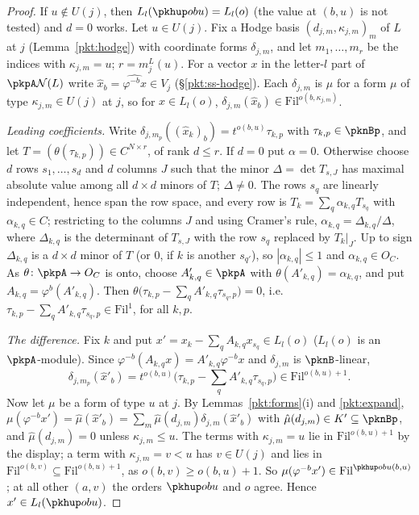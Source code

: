 \documentclass[10pt]{amsart}
\theoremstyle{definition}
\theoremstyle{remark}
\begin{document}
\begin{proof}
If $u\notin U(j)$, then $L_l(\pkhup obu)=L_l(o)$ (the value at $(b,u)$ is not tested) and $d=0$ works. Let
$u\in U(j)$. Fix a Hodge basis $(d_{j,m},\kappa_{j,m})_m$ of $L$ at $j$ (Lemma~\ref{pkt:hodge}) with coordinate
forms $\delta_{j,m}$, and let $m_1,\dots,m_r$ be the indices with $\kappa_{j,m}=u$; $r=m^L_j(u)$. For a vector
$x$ in the letter-$l$ part of $\pkpA\mathcal N(L)$ write $\hat x_b=\widehat{\varphi^{-b}x}\in V_j$
(\S\ref{pkt:ss-hodge}). Each $\delta_{j,m}$ is $\hat\mu$ for a form $\mu$ of type $\kappa_{j,m}\in U(j)$ at $j$,
so for $x\in L_l(o)$, $\delta_{j,m}(\hat x_b)\in\mathrm{Fil}^{o(b,\kappa_{j,m})}$.

\emph{Leading coefficients.} Write $\delta_{j,m_p}((\hat x_k)_b)=t^{o(b,u)}\tau_{k,p}$ with $\tau_{k,p}\in\pknBp$,
and let $T=(\theta(\tau_{k,p}))\in C^{N\times r}$, of rank $d\le r$. If $d=0$ put $\alpha=0$. Otherwise choose
$d$ rows $s_1,\dots,s_d$ and $d$ columns $J$ such that the minor $\Delta=\det T_{s,J}$ has maximal absolute
value among all $d\times d$ minors of $T$; $\Delta\ne0$. The rows $s_q$ are linearly independent, hence span
the row space, and every row is $T_k=\sum_q\alpha_{k,q}T_{s_q}$ with $\alpha_{k,q}\in C$; restricting to the
columns $J$ and using Cramer's rule, $\alpha_{k,q}=\Delta_{k,q}/\Delta$, where $\Delta_{k,q}$ is the determinant
of $T_{s,J}$ with the row $s_q$ replaced by $T_k|_J$. Up to sign $\Delta_{k,q}$ is a $d\times d$ minor of $T$
(or $0$, if $k$ is another $s_{q'}$), so $|\alpha_{k,q}|\le1$ and $\alpha_{k,q}\in O_C$. As $\theta\colon\pkpA\to
O_C$ is onto, choose $A'_{k,q}\in\pkpA$ with $\theta(A'_{k,q})=\alpha_{k,q}$, and put $A_{k,q}=\varphi^b(A'_{k,q})$.
Then $\theta\bigl(\tau_{k,p}-\sum_qA'_{k,q}\tau_{s_q,p}\bigr)=0$, i.e.\
$\tau_{k,p}-\sum_qA'_{k,q}\tau_{s_q,p}\in\mathrm{Fil}^1$, for all $k,p$.

\emph{The difference.} Fix $k$ and put $x'=x_k-\sum_qA_{k,q}x_{s_q}\in L_l(o)$ ($L_l(o)$ is an $\pkpA$-module).
Since $\varphi^{-b}(A_{k,q}x)=A'_{k,q}\varphi^{-b}x$ and $\delta_{j,m}$ is $\pknB$-linear,
\[
\delta_{j,m_p}(\hat x'_b)=t^{o(b,u)}\bigl(\tau_{k,p}-\textstyle\sum_qA'_{k,q}\tau_{s_q,p}\bigr)\in
\mathrm{Fil}^{o(b,u)+1}.
\]
Now let $\mu$ be a form of type $u$ at $j$. By Lemmas~\ref{pkt:forms}(i) and \ref{pkt:expand},
$\mu(\varphi^{-b}x')=\hat\mu(\hat x'_b)=\sum_m\hat\mu(d_{j,m})\delta_{j,m}(\hat x'_b)$ with $\hat\mu(d_{j,m})\in
K'\subseteq\pknBp$, and $\hat\mu(d_{j,m})=0$ unless $\kappa_{j,m}\le u$. The terms with $\kappa_{j,m}=u$ lie in
$\mathrm{Fil}^{o(b,u)+1}$ by the display; a term with $\kappa_{j,m}=v<u$ has $v\in U(j)$ and lies in
$\mathrm{Fil}^{o(b,v)}\subseteq\mathrm{Fil}^{o(b,u)+1}$, as $o(b,v)\ge o(b,u)+1$. So $\mu(\varphi^{-b}x')\in
\mathrm{Fil}^{\pkhup obu(b,u)}$; at all other $(a,v)$ the orders $\pkhup obu$ and $o$ agree. Hence $x'\in
L_l(\pkhup obu)$.
\end{proof}
\end{document}
